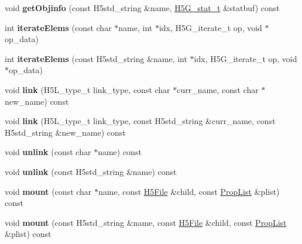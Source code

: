 \begin{DoxyCompactItemize}
void {\bfseries get\+Objinfo} (const H5std\+\_\+string \&name, \hyperlink{struct_h5_g__stat__t}{H5\+G\+\_\+stat\+\_\+t} \&statbuf) const
\item 
\mbox{\label{class_h5_1_1_h5_location_abf1d859e124f6c2fec7a5db3f8942159}} 
int {\bfseries iterate\+Elems} (const char $\ast$name, int $\ast$idx, H5\+G\+\_\+iterate\+\_\+t op, void $\ast$op\+\_\+data)
\item 
\mbox{\label{class_h5_1_1_h5_location_a2b9bb5d3de29447f5c8878e2a48de317}} 
int {\bfseries iterate\+Elems} (const H5std\+\_\+string \&name, int $\ast$idx, H5\+G\+\_\+iterate\+\_\+t op, void $\ast$op\+\_\+data)
\item 
\mbox{\label{class_h5_1_1_h5_location_a212fd661cc85152e11f694e4044c62db}} 
void {\bfseries link} (H5\+L\+\_\+type\+\_\+t link\+\_\+type, const char $\ast$curr\+\_\+name, const char $\ast$new\+\_\+name) const
\item 
\mbox{\label{class_h5_1_1_h5_location_a76d53556d90a4add7a8c16fda97c7864}} 
void {\bfseries link} (H5\+L\+\_\+type\+\_\+t link\+\_\+type, const H5std\+\_\+string \&curr\+\_\+name, const H5std\+\_\+string \&new\+\_\+name) const
\item 
\mbox{\label{class_h5_1_1_h5_location_af1cfe7e54e5ab59b819240a78030c5bd}} 
void {\bfseries unlink} (const char $\ast$name) const
\item 
\mbox{\label{class_h5_1_1_h5_location_a32a71854f9ab8b460aa50057e5a119cf}} 
void {\bfseries unlink} (const H5std\+\_\+string \&name) const
\item 
\mbox{\label{class_h5_1_1_h5_location_ac36e6d1913457112281c01c24a0862a7}} 
void {\bfseries mount} (const char $\ast$name, const \hyperlink{class_h5_1_1_h5_file}{H5\+File} \&child, const \hyperlink{class_h5_1_1_prop_list}{Prop\+List} \&plist) const
\item 
\mbox{\label{class_h5_1_1_h5_location_aa03d003e87b9ee3a2ae1c7f5f5c64b06}} 
void {\bfseries mount} (const H5std\+\_\+string \&name, const \hyperlink{class_h5_1_1_h5_file}{H5\+File} \&child, const \hyperlink{class_h5_1_1_prop_list}{Prop\+List} \&plist) const

\end{DoxyCompactItemize}
